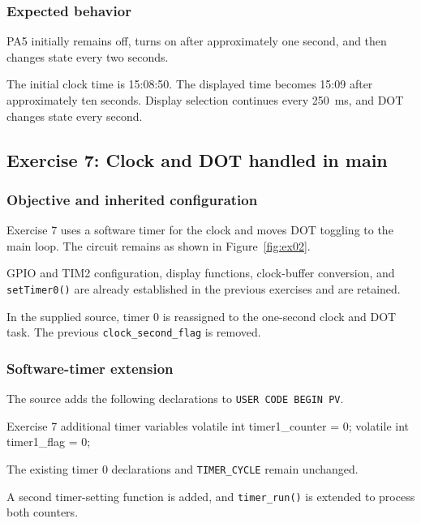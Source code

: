 \documentclass[a4paper]{article}
\begin{document}
\subsubsection{Expected behavior}

PA5 initially remains off, turns on after
approximately one second, and then changes
state every two seconds.

The initial clock time is 15:08:50.
The displayed time becomes 15:09 after
approximately ten seconds. Display selection
continues every 250~ms, and DOT changes
state every second.


\subsection{Exercise 7: Clock and DOT handled in main}

\subsubsection{Objective and inherited configuration}

Exercise 7 uses a software timer for the clock
and moves DOT toggling to the main loop.
The circuit remains as shown in
Figure~\ref{fig:ex02}.

GPIO and TIM2 configuration, display functions,
clock-buffer conversion, and
\texttt{setTimer0()} are already established
in the previous exercises and are retained.

In the supplied source, timer 0 is reassigned
to the one-second clock and DOT task.
The previous \texttt{clock\_second\_flag}
is removed.

\subsubsection{Software-timer extension}

The source adds the following declarations
to \texttt{USER CODE BEGIN PV}.

\begin{stmcode}{Exercise 7 additional timer variables}
volatile int timer1_counter = 0;
volatile int timer1_flag = 0;
\end{stmcode}

The existing timer 0 declarations and
\texttt{TIMER\_CYCLE} remain unchanged.

A second timer-setting function is added,
and \texttt{timer\_run()} is extended to
process both counters.
\end{document}
